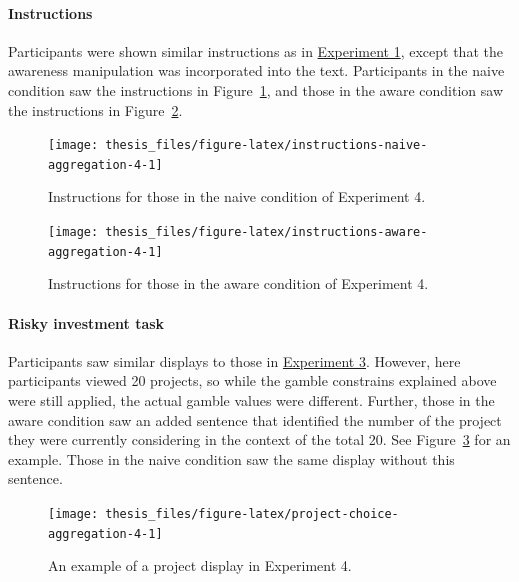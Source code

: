 \documentclass[a4paper, nobind, dvipsnames]{templates/ociamthesis}
\theoremstyle{definition}
\theoremstyle{definition}
\theoremstyle{definition}
\theoremstyle{definition}
\theoremstyle{remark}
\begin{document}
\hypertarget{instructions-6}{%
\paragraph{Instructions}\label{instructions-6}}

Participants were shown similar instructions as in
\protect\hyperlink{instructions-materials-aggregation-1}{Experiment 1}, except that the awareness
manipulation was incorporated into the text. Participants in the naive condition
saw the instructions in Figure~\ref{fig:instructions-naive-aggregation-4}, and
those in the aware condition saw the instructions in
Figure~\ref{fig:instructions-aware-aggregation-4}.



\begin{figure}
\texttt{[image: thesis\_files/figure-latex/instructions-naive-aggregation-4-1]} \caption{Instructions for those in the naive condition of Experiment 4.}\label{fig:instructions-naive-aggregation-4}
\end{figure}



\begin{figure}
\texttt{[image: thesis\_files/figure-latex/instructions-aware-aggregation-4-1]} \caption{Instructions for those in the aware condition of Experiment 4.}\label{fig:instructions-aware-aggregation-4}
\end{figure}

\hypertarget{risky-investment-task}{%
\paragraph{Risky investment task}\label{risky-investment-task}}

Participants saw similar displays to those in
\protect\hyperlink{task-aggregation-3}{Experiment 3}. However, here participants viewed 20
projects, so while the gamble constrains explained above were still applied, the
actual gamble values were different. Further, those in the aware condition saw
an added sentence that identified the number of the project they were currently
considering in the context of the total 20. See
Figure~\ref{fig:project-choice-aggregation-4} for an example. Those in the
naive condition saw the same display without this sentence.



\begin{figure}
\texttt{[image: thesis\_files/figure-latex/project-choice-aggregation-4-1]} \caption{An example of a project display in Experiment 4.}\label{fig:project-choice-aggregation-4}
\end{figure}
\end{document}
